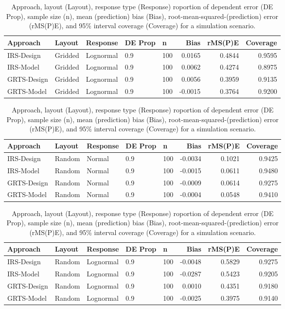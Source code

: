 \documentclass[]{elsarticle} %
\begin{document}
\begin{table}[ht]
\centering
\begin{tabular}{lllllrrr}
  \hline
Approach & Layout & Response & DE Prop & n & Bias & rMS(P)E & Coverage \\ 
  \hline
IRS-Design & Gridded & Lognormal & 0.9 & 100 & 0.0165 & 0.4844 & 0.9595 \\ 
  IRS-Model & Gridded & Lognormal & 0.9 & 100 & 0.0062 & 0.4274 & 0.8975 \\ 
  GRTS-Design & Gridded & Lognormal & 0.9 & 100 & 0.0056 & 0.3959 & 0.9135 \\ 
  GRTS-Model & Gridded & Lognormal & 0.9 & 100 & -0.0015 & 0.3764 & 0.9200 \\ 
   \hline
\end{tabular}
\caption{Approach, layout (Layout), response type (Response) roportion of dependent error (DE Prop), sample size (n), mean (prediction) bias (Bias), root-mean-squared-(prediction) error (rMS(P)E), and 95\% interval coverage (Coverage) for a simulation scenario.} 
\end{table}
\begin{table}[ht]
\centering
\begin{tabular}{lllllrrr}
  \hline
Approach & Layout & Response & DE Prop & n & Bias & rMS(P)E & Coverage \\ 
  \hline
IRS-Design & Random & Normal & 0.9 & 100 & -0.0034 & 0.1021 & 0.9425 \\ 
  IRS-Model & Random & Normal & 0.9 & 100 & -0.0015 & 0.0611 & 0.9480 \\ 
  GRTS-Design & Random & Normal & 0.9 & 100 & -0.0009 & 0.0614 & 0.9275 \\ 
  GRTS-Model & Random & Normal & 0.9 & 100 & -0.0004 & 0.0548 & 0.9410 \\ 
   \hline
\end{tabular}
\caption{Approach, layout (Layout), response type (Response) roportion of dependent error (DE Prop), sample size (n), mean (prediction) bias (Bias), root-mean-squared-(prediction) error (rMS(P)E), and 95\% interval coverage (Coverage) for a simulation scenario.} 
\end{table}
\begin{table}[ht]
\centering
\begin{tabular}{lllllrrr}
  \hline
Approach & Layout & Response & DE Prop & n & Bias & rMS(P)E & Coverage \\ 
  \hline
IRS-Design & Random & Lognormal & 0.9 & 100 & -0.0048 & 0.5829 & 0.9275 \\ 
  IRS-Model & Random & Lognormal & 0.9 & 100 & -0.0287 & 0.5423 & 0.9205 \\ 
  GRTS-Design & Random & Lognormal & 0.9 & 100 & 0.0010 & 0.4351 & 0.9180 \\ 
  GRTS-Model & Random & Lognormal & 0.9 & 100 & -0.0025 & 0.3975 & 0.9140 \\ 
   \hline
\end{tabular}
\caption{Approach, layout (Layout), response type (Response) roportion of dependent error (DE Prop), sample size (n), mean (prediction) bias (Bias), root-mean-squared-(prediction) error (rMS(P)E), and 95\% interval coverage (Coverage) for a simulation scenario.} 
\end{table}
\end{document}
